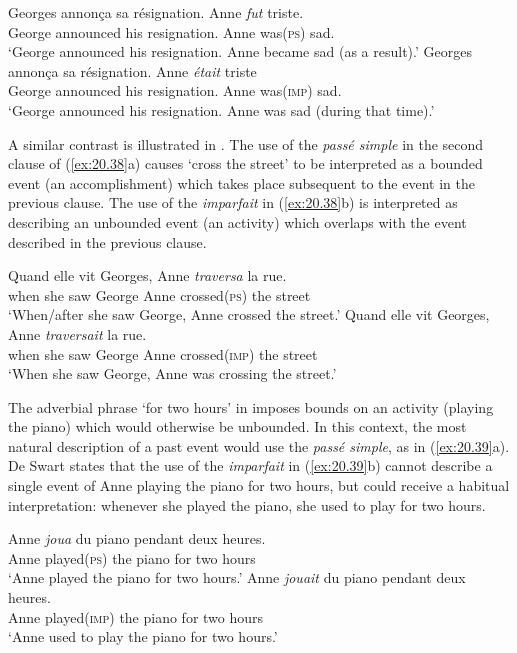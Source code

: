 \ea \label{ex:20.37}
\ea   \gll Georges  annonça  sa  résignation.  Anne  \textit{fut}  triste.\\
George  announced  his  resignation.  Anne  was(\textsc{ps})  sad.\\
\glt ‘George announced his resignation. Anne became sad (as a result).’
\ex \gll  Georges  annonça  sa  résignation.  Anne  \textit{était}  triste\\
George  announced  his  resignation.  Anne  was(\textsc{imp})  sad.\\
\glt ‘George announced his resignation. Anne was sad (during that time).’
\z \z


A similar contrast is illustrated in . The use of the \textit{passé simple} in the second clause of (\ref{ex:20.38}a) causes ‘cross the street’ to be interpreted as a bounded event (an accomplishment) which takes place subsequent to the event in the previous clause. The use of the \textit{imparfait} in (\ref{ex:20.38}b) is interpreted as describing an unbounded event (an activity) which overlaps with the event described in the previous clause.


\ea \label{ex:20.38}
\ea  \gll Quand  elle  vit  Georges,  Anne  \textit{traversa}  la  rue.\\
when  she  saw  George  Anne  crossed(\textsc{ps})  the  street\\
\glt ‘When/after she saw George, Anne crossed the street.’
\ex \gll  Quand  elle  vit  Georges,  Anne  \textit{traversait}  la  rue.\\
when  she  saw  George  Anne  crossed(\textsc{imp})  the  street\\
\glt ‘When she saw George, Anne was crossing the street.’
\z \z


The adverbial phrase ‘for two hours’ in  imposes bounds on an activity (playing the piano) which would otherwise be unbounded. In this context, the most natural description of a past event would use the \textit{passé simple}, as in (\ref{ex:20.39}a). De Swart states that the use of the \textit{imparfait} in (\ref{ex:20.39}b) cannot describe a single event of Anne playing the piano for two hours, but could receive a habitual interpretation: whenever she played the piano, she used to play for two hours.


\ea \label{ex:20.39}
\ea  \gll  Anne  \textit{joua}  du  piano  pendant  deux  heures.\\
Anne  played(\textsc{ps})  the  piano  for  two  hours\\
\glt ‘Anne played the piano for two hours.’
\ex \gll  Anne  \textit{jouait}  du  piano  pendant  deux  heures.\\
Anne  played(\textsc{imp})  the  piano  for  two  hours\\
\glt ‘Anne used to play the piano for two hours.’
\z \z


